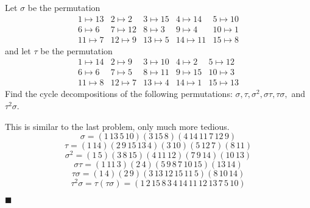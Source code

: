 \documentclass[12pt]{article}
\renewcommand{\qed}{\hfill$\blacksquare$}
\renewenvironment{proof}{\begin{addmargin}[1em]{0em}\begin{newproof}}{\end{newproof}\end{addmargin}\qed}
\newenvironment{problem}[2][Exercise]{\begin{trivlist}
\item[\hskip \labelsep {\bfseries #1}\hskip \labelsep {\bfseries #2.}]}{\end{trivlist}}
\begin{document}
\begin{problem}{1.3.2}
Let $\sigma$ be the permutation
\begin{equation*}
    \begin{array}{ccccc}
    1 \mapsto 13
 & 2 \mapsto 2 & 3 \mapsto 15 & 4 \mapsto 14 & 5 \mapsto 10 \\     6 \mapsto 6 & 7\mapsto 12 & 8 \mapsto 3 & 9\mapsto 4 & 10 \mapsto 1 \\ 11 \mapsto 7 & 12 \mapsto 9 & 13 \mapsto 5 & 14 \mapsto 11 & 15 \mapsto 8
    \end{array}
\end{equation*}
and let $\tau$ be the permutation
\begin{equation*}
    \begin{array}{ccccc}
    1 \mapsto 14
 & 2 \mapsto 9 & 3 \mapsto 10 & 4 \mapsto 2 & 5 \mapsto 12 \\     6 \mapsto 6 & 7\mapsto 5 & 8 \mapsto 11 & 9\mapsto 15 & 10 \mapsto 3 \\ 11 \mapsto 8 & 12 \mapsto 7 & 13 \mapsto 4 & 14 \mapsto 1 & 15 \mapsto 13
    \end{array}
\end{equation*}
Find the cycle decompositions of the following permutations: $\sigma, \tau, \sigma^2, \sigma \tau, \tau \sigma,$ and $\tau^2 \sigma$.
\end{problem}
\begin{proof}
This is similar to the last problem, only much more tedious.
$$ \sigma = \left(1\,13\,5\,10\right)\left(3\,15\,8\right)\left(4\,14\,11\,7\,12\,9\right)$$
$$ \tau = \left(1\, 14\right)\left(2\, 9\, 15\, 13 \,4\right) \left(3\,10\right) \left(5\,12\,7\right)\left(8\, 11\right)$$
$$ \sigma^2 = \left(1\,5\right)\left(3\,8\,15\right) \left(4\,11\,12\right)\left(7\,9\,14\right)\left(10\,13\right) $$
$$ \sigma \tau = \left(1\,11\,3\right)\left(2\,4\right) \left(5\,9\,8\,7\,10\,15\right) \left(13\,14 \right) $$
$$ \tau \sigma = \left(1\,4\right) \left(2\,9\right)\left(3\,13\,12\,15\,11\,5\right)\left(8\,10\,14\right) $$
$$ \tau^2\sigma = \tau\left(\tau\sigma\right) = \left(1\,2\,15\,8\,3\,4\,14\,11\,12\,13\,7\,5\,10\right)$$
\end{proof}
\end{document}
